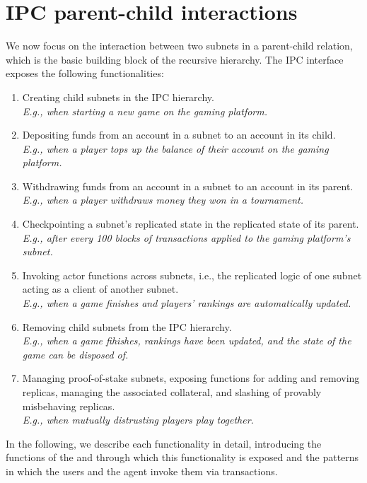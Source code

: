 \section{IPC parent-child interactions}
\label{sec:functionality}

We now focus on the interaction between two subnets in a parent-child relation, which is the basic building block of the recursive \ipc hierarchy.
The IPC interface exposes the following functionalities:
\begin{enumerate}

    \item Creating child subnets in the IPC hierarchy.\\
    \emph{E.g., when starting a new game on the gaming platform.}
    
    \item Depositing funds from an account in a subnet to an account in its child.\\
    \emph{E.g., when a player tops up the balance of their account on the gaming platform.}
    
    \item Withdrawing funds from an account in a subnet to an account in its parent.\\
    \emph{E.g., when a player withdraws money they won in a tournament.}
    
    \item Checkpointing a subnet's replicated state in the replicated state of its parent.\\
    \emph{E.g., after every 100 blocks of transactions applied to the gaming platform's subnet.}
    
    \item Invoking actor functions across subnets, i.e., the replicated logic of one subnet acting as a client of another subnet.\\
    \emph{E.g., when a game finishes and players' rankings are automatically updated.}
    
    \item Removing child subnets from the IPC hierarchy.\\
    \emph{E.g., when a game fihishes, rankings have been updated, and the state of the game can be disposed of.}
    
    \item Managing proof-of-stake subnets, exposing functions for adding and removing replicas, managing the associated collateral, and slashing of provably misbehaving replicas.\\
    \emph{E.g., when mutually distrusting players play together.}
\end{enumerate}
In the following, we describe each functionality in detail, introducing the functions of the \gw and \sa through which this functionality is exposed
and the patterns in which the users and the \ipc agent invoke them via transactions.


